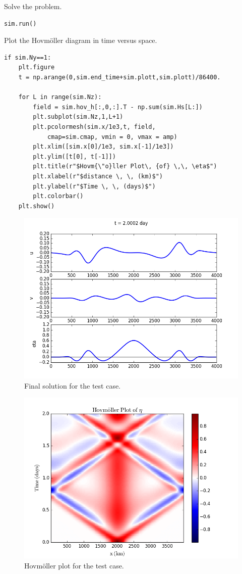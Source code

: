 \documentclass[11pt]{article}
\begin{document}
Solve the problem.
\begin{lstlisting}
sim.run()             
\end{lstlisting}

Plot the Hovm\"oller diagram in time versus space.
\begin{lstlisting}
if sim.Ny==1:
    plt.figure               
    t = np.arange(0,sim.end_time+sim.plott,sim.plott)/86400.
        
    for L in range(sim.Nz):
        field = sim.hov_h[:,0,:].T - np.sum(sim.Hs[L:])
        plt.subplot(sim.Nz,1,L+1)
        plt.pcolormesh(sim.x/1e3,t, field,
            cmap=sim.cmap, vmin = 0, vmax = amp)
        plt.xlim([sim.x[0]/1e3, sim.x[-1]/1e3])
        plt.ylim([t[0], t[-1]])
        plt.title(r"$Hovm{\"o}ller Plot\, {of} \,\, \eta$")
        plt.xlabel(r"$distance \, \, (km)$")
        plt.ylabel(r"$Time \, \, (days)$")
        plt.colorbar()
    plt.show()
\end{lstlisting}

\begin{figure}[h]
\begin{center}
\includegraphics[width=12cm]{Figures/ex1_fig1.png}
\caption{Final solution for the test case.}
\end{center}
\end{figure}

\begin{figure}[h]
\begin{center}
\includegraphics[width=12cm]{Figures/ex1_fig2.png}
\caption{Hovm\"oller plot for the test case.}
\end{center}
\end{figure}
\end{document}
